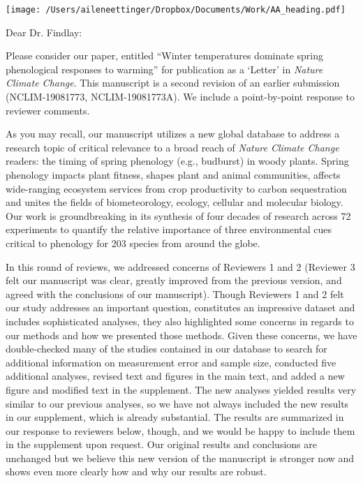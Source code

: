 \documentclass[11.5pt,a4paper]{letter}
\begin{document}
\begin{letter}{}
\texttt{[image: /Users/aileneettinger/Dropbox/Documents/Work/AA\_heading.pdf]}

\opening{Dear Dr. Findlay:}
Please consider our paper, entitled ``Winter temperatures dominate spring phenological responses to warming'' for publication as a `Letter' in \emph{Nature Climate Change}. This manuscript is a second revision of an earlier submission (NCLIM-19081773, NCLIM-19081773A). We include a point-by-point response to reviewer comments. 

\par As you may recall, our manuscript utilizes a new global database to address a research topic of critical relevance to a broad reach of \emph{Nature Climate Change} readers:  the timing of spring phenology (e.g., budburst) in woody plants. Spring phenology impacts plant fitness, shapes plant and animal communities, affects wide-ranging ecosystem services from crop productivity to carbon sequestration and unites the fields of biometeorology, ecology, cellular and molecular biology. Our work is groundbreaking in its synthesis of four decades of research across 72 experiments to quantify the relative importance of three environmental cues critical to phenology for 203 species from around the globe. 

\par In this round of reviews, we addressed concerns of Reviewers 1 and 2 (Reviewer 3 felt our manuscript was clear, greatly improved from the previous version, and agreed with the conclusions of our manuscript). Though Reviewers 1 and 2  felt our study addresses an important question, constitutes an impressive dataset and includes sophisticated analyses, they also highlighted some concerns in regards to our methods and how we presented those methods. Given these concerns, we have double-checked many of the studies contained in our database to search for additional information on measurement error and sample size, conducted five additional analyses, revised text and figures in the main text, and added a new figure and modified text in the supplement. The new analyses yielded results very similar to our previous analyses, so we have not always included the new results in our supplement, which is already substantial. The results are summarized in our response to reviewers below, though, and we would be happy to include them in the supplement upon request. Our original results and conclusions are unchanged but we believe this new version of the manuscript is stronger now and shows even more clearly how and why our results are robust.


\end{letter}
\end{document}
